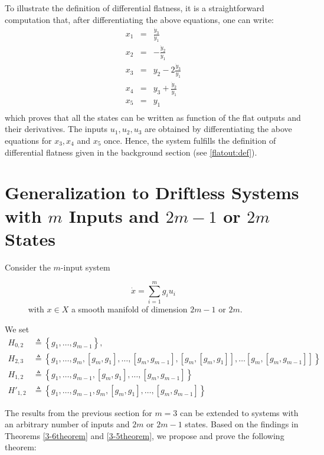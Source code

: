 \documentclass[10pt]{article}
\newcommand{\3}{\mathbf{3}}
\newcommand{\2}{\mathbf{2}}
\newcommand{\1}{\mathbf{1}}
\newcommand{\0}{\mathbf{0}}
\begin{document}
To illustrate the definition of differential flatness, it is a straightforward computation that, after differentiating the above equations, one can write:
\begin{eqnarray*}
  x_1 &=& \frac{\dot{y}_3}{\dot{y}_1} \\
  x_2 &=& -\frac{\dot{y}_2}{\dot{y}_1} \\
  x_3 &=& y_2-2\frac{\dot{y}_3}{\dot{y}_1} \\
  x_4 &=& y_3+\frac{\dot{y}_2}{\dot{y}_1} \\
  x_5 &=& y_1 \\
   \end{eqnarray*}
which proves that all the states can be written as function of the flat outputs and their derivatives. The inputs $u_1,u_2,u_3$ are obtained by differentiating the above equations for $x_3,x_4$ and $x_5$ once. Hence, the system fulfills the definition of differential flatness given in the background section (see \eqref{flatout:def}).



\section{Generalization to Driftless Systems with $m$ Inputs and $2m-1$ or $2m$ States}
\label{m-inputs-section}

Consider the $m$-input system

\begin{equation}
\label{sys_m_inputs:eq}
\dot{x} = \sum_{i=1}^{m}g_i u_i\end{equation}     
with $x\in X$ a smooth manifold of dimension $2m-1$ or $2m$.

We set
\begin{equation}
\begin{aligned}
H_{0,2}&\triangleq \left\{g_{1},\dots, g_{m-1}\right\},\\
H_{2,3} &\triangleq \left\{g_{1}, \dots, g_{m}, [g_{m},g_{1}], \dots, [g_{m},g_{m-1}], [g_{m},[g_{m},g_{1}]], \dots [g_{m},[g_{m},g_{m-1}]] \right\}\\
H_{1,2} &\triangleq \left\{g_{1},\dots, g_{m-1}, [g_{m},g_{1}],\dots, [g_{m},g_{m-1}]\right\}\\
H'_{1,2} &\triangleq \left\{g_{1},\dots, g_{m-1}, g_m, [g_{m},g_{1}],\dots, [g_{m},g_{m-1}]\right\}
\end{aligned}
\end{equation}

The results from the previous section for $m=3$ can be extended to systems with an arbitrary number of inputs and $2m$ or $2m-1$ states. Based on the findings in Theorems \ref{3-6theorem} and \ref{3-5theorem}, we propose and prove the following theorem:
\end{document}
